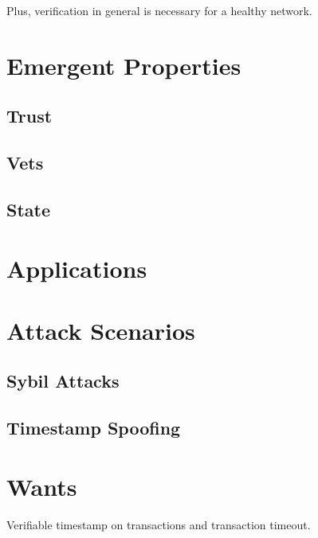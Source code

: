 \documentclass[twocolumn, a4paper]{article}
\begin{document}
Plus, verification in general is necessary for a healthy network.

\section{Emergent Properties}

\subsection{Trust}
\label{ssec:trust}

\subsection{Vets}

\subsection{State}

\section{Applications}
\label{sec:applications}

\section{Attack Scenarios}

\subsection{Sybil Attacks}
\label{ssec:sybil}

\subsection{Timestamp Spoofing}

\section{Wants}

Verifiable timestamp on transactions and transaction timeout.



\end{document}
